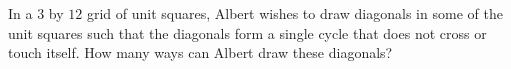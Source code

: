 In a $3$ by $12$ grid of unit squares, Albert wishes to draw diagonals in some of the unit squares such that the diagonals form a single cycle that does not cross or touch itself. How many ways can Albert draw these diagonals?
